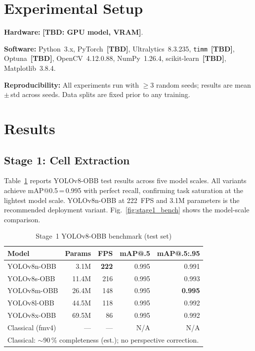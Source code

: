 \documentclass[conference]{IEEEtran}
\begin{document}
\section{Experimental Setup}
\label{sec:setup}

\textbf{Hardware:} \textbf{[TBD: GPU model, VRAM]}.

\textbf{Software:} Python~3.x, PyTorch~\textbf{[TBD]},
Ultralytics~8.3.235, \texttt{timm}~\textbf{[TBD]},
Optuna~\textbf{[TBD]}, OpenCV~4.12.0.88, NumPy~1.26.4,
scikit-learn~\textbf{[TBD]}, Matplotlib~3.8.4.

\textbf{Reproducibility:} All experiments run with $\geq$3
random seeds; results are mean\,$\pm$\,std across seeds.
Data splits are fixed prior to any training.

\section{Results}
\label{sec:results}

\subsection{Stage 1: Cell Extraction}

Table~\ref{tab:stage1_results} reports YOLOv8-OBB test
results across five model scales. All variants achieve
mAP@0.5\,=\,0.995 with perfect recall, confirming task
saturation at the lightest model scale.
YOLOv8n-OBB at 222~FPS and 3.1M parameters is the
recommended deployment variant.
Fig.~\ref{fig:stage1_bench} shows the model-scale comparison.

\begin{table}[t]
  \caption{Stage~1 YOLOv8-OBB benchmark (test set)}
  \label{tab:stage1_results}
  \begin{center}
  \renewcommand{\arraystretch}{1.05}
  \small
  \begin{tabular}{lrrrr}
    \toprule
    \textbf{Model} & \textbf{Params} &
    \textbf{FPS} & \textbf{mAP@.5} & \textbf{mAP@.5:.95} \\
    \midrule
    YOLOv8n-OBB & 3.1M  & \textbf{222} & 0.995 & 0.991 \\
    YOLOv8s-OBB & 11.4M & 216          & 0.995 & 0.993 \\
    YOLOv8m-OBB & 26.4M & 148          & 0.995 & \textbf{0.995} \\
    YOLOv8l-OBB & 44.5M & 118          & 0.995 & 0.992 \\
    YOLOv8x-OBB & 69.5M & 86           & 0.995 & 0.992 \\
    \midrule
    Classical (fmv4) & --- & --- & N/A & N/A \\
    \bottomrule
    \multicolumn{5}{l}{\footnotesize Classical: $\sim$90\,\%
    completeness (est.); no perspective correction.}
  \end{tabular}
  \end{center}
\end{table}
\end{document}
